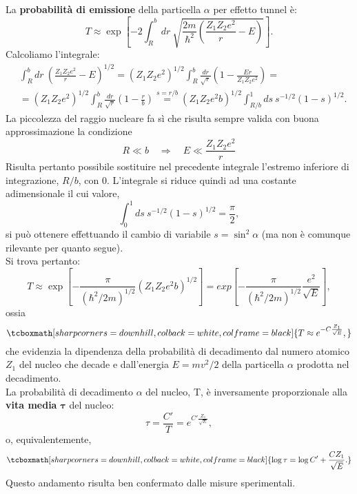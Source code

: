 La \textbf{probabilità di emissione} della particella $\alpha$ per effetto tunnel è:
	\begin{equation}
		T \approx \exp \left[ -2 \int _R ^b dr\ \sqrt{\frac{2m}{\hbar ^2}\left(\frac{Z_1 Z_2 e^2}{r}-E\right)}\right].
	\end{equation}
Calcoliamo l'integrale:
	\begin{align}
		&\displaystyle{\int _R ^b dr\ \left(\frac{Z_1 Z_2 e^2}{r}-E\right)^{1/2}=\left(Z_1 Z_2 e^2\right)^{1/2}\int _R ^b \frac{dr}{\sqrt{r}}\left(1-\frac{Er}{Z_1 Z_2 e^2}\right)=}\nonumber \\
		&\displaystyle{=\left(Z_1 Z_2 e^2\right)^{1/2}\int _R ^b \frac{dr}{\sqrt{r}}\left(1-\frac{r}{b}\right)\overset{s=r/b}{=}}\displaystyle{\left(Z_1 Z_2 e^2 b\right)^{1/2}\int _{R/b} ^1 ds\ s^{-1/2} (1-s)^{1/2}}.
	\end{align}
La piccolezza del raggio nucleare fa sì che risulta sempre valida con buona approssimazione la condizione
	\begin{equation}
		R\ll b \quad \Rightarrow \quad E \ll \frac{Z_1 Z_2 e^2}{r}
	\end{equation}
Risulta pertanto possibile sostituire nel precedente integrale l'estremo inferiore di integrazione, $R/b$, con $0$. L'integrale si riduce quindi ad una costante adimensionale il cui valore,
	\begin{equation}
		\int _{0} ^1 ds\ s^{-1/2} (1-s)^{1/2}= \frac{\pi}{2},
	\end{equation}
si può ottenere effettuando il cambio di variabile $s= \sin^2 \alpha$ (ma non è comunque rilevante per quanto segue).\\
Si trova pertanto:
	\begin{equation}
		T\approx  \exp \left[ -\frac{\pi}{(\hbar ^2 /2m)^{1/2}}\left(Z_1 Z_2 e^2 b\right)^{1/2}\right]=  exp \left[ -\frac{\pi}{(\hbar ^2 /2m)^{1/2}}\frac{e^2}{\sqrt{E}}\right],
	\end{equation}
ossia
	\begin{equation}
		\tcboxmath[sharp corners=downhill, colback=white, colframe=black]{
			T \approx e^{-C\frac{Z_1}{\sqrt{E}}},
			}
	\end{equation}
che evidenzia la dipendenza della probabilità di decadimento dal numero atomico $Z_1$ del nucleo che decade e dall'energia $E=mv^2/2$ della particella $\alpha$ prodotta nel decadimento.\\

La probabilità di decadimento $\alpha$ del nucleo, T, è inversamente proporzionale alla \textbf{vita media} $\mathbf{\tau}$ del nucleo:
	\begin{equation}
		\tau=\frac{C'}{T}=e^{C'\frac{Z_1}{\sqrt{E}}},
	\end{equation}
o, equivalentemente,
	\begin{equation}
		\tcboxmath[sharp corners=downhill, colback=white, colframe=black]{
			\log \tau = \log C' + \frac{C Z_1}{\sqrt{E}}.
			}
	\end{equation}
Questo andamento risulta ben confermato dalle misure sperimentali.
